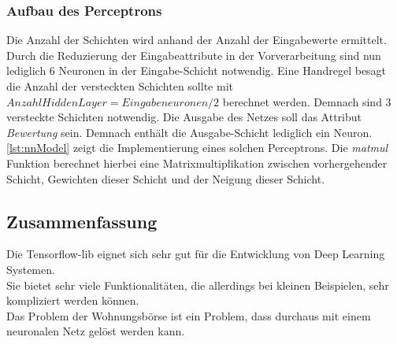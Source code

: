 \subsubsection{Aufbau des Perceptrons}
Die Anzahl der Schichten wird anhand der Anzahl der Eingabewerte ermittelt. 
Durch die Reduzierung der Eingabeattribute in der Vorverarbeitung sind nun lediglich 6 Neuronen in 
der Eingabe-Schicht notwendig. Eine Handregel besagt die Anzahl der versteckten Schichten sollte mit
$Anzahl Hidden Layer = Eingabeneuronen/2$ berechnet werden. Demnach sind 3 versteckte Schichten notwendig. 
Die Ausgabe des Netzes soll das Attribut \textit{Bewertung} sein. Demnach enthält die 
Ausgabe-Schicht lediglich ein Neuron.\\
\autoref{lst:nnModel} zeigt die Implementierung eines solchen Perceptrons. Die \textit{matmul} Funktion 
berechnet hierbei eine Matrixmultiplikation zwischen vorhergehender Schicht, Gewichten dieser Schicht und der Neigung dieser Schicht.


\subsection{Zusammenfassung}
Die Tensorflow-lib eignet sich sehr gut für die Entwicklung von Deep Learning Systemen. \\
Sie bietet sehr viele Funktionalitäten, die allerdings bei kleinen Beispielen, sehr kompliziert 
werden können.\\
Das Problem der Wohnungsbörse ist ein Problem, dass durchaus mit einem neuronalen Netz gelöst werden kann. 


